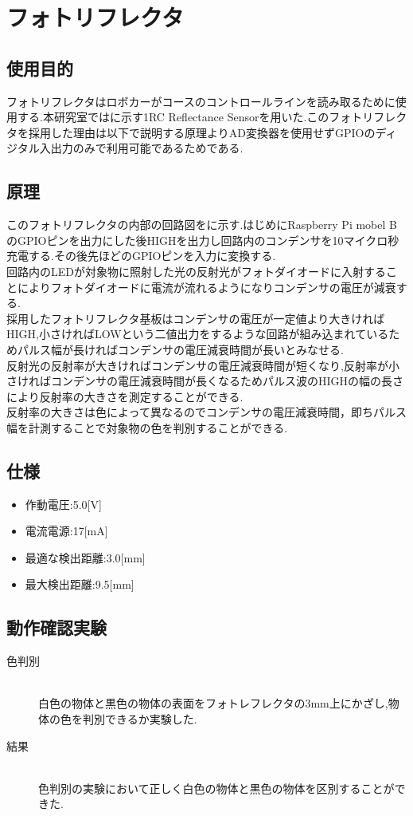 \section{フォトリフレクタ}
\subsection{使用目的}
フォトリフレクタはロボカーがコースのコントロールラインを読み取るために使用する.本研究室ではに示す1RC Reflectance Sensorを用いた.このフォトリフレクタを採用した理由は以下で説明する原理よりAD変換器を使用せずGPIOのディジタル入出力のみで利用可能であるためである.   


\subsection{原理}
このフォトリフレクタの内部の回路図\cite{pololu}をに示す.はじめにRaspberry Pi mobel BのGPIOピンを出力にした後HIGHを出力し回路内のコンデンサを10マイクロ秒充電する.その後先ほどのGPIOピンを入力に変換する.\\
回路内のLEDが対象物に照射した光の反射光がフォトダイオードに入射することによりフォトダイオードに電流が流れるようになりコンデンサの電圧が減衰する.\\
採用したフォトリフレクタ基板はコンデンサの電圧が一定値より大きければHIGH,小さければLOWという二値出力をするような回路が組み込まれているためパルス幅が長ければコンデンサの電圧減衰時間が長いとみなせる.\\
反射光の反射率が大きければコンデンサの電圧減衰時間が短くなり,反射率が小さければコンデンサの電圧減衰時間が長くなるためパルス波のHIGHの幅の長さにより反射率の大きさを測定することができる.\\
反射率の大きさは色によって異なるのでコンデンサの電圧減衰時間，即ちパルス幅を計測することで対象物の色を判別することができる.

\subsection*{仕様}
\begin{itemize}
\item 作動電圧:5.0[V]
\item 電流電源:17[mA]
\item 最適な検出距離:3.0[mm]
\item 最大検出距離:9.5[mm]
\end{itemize}


\subsection{動作確認実験}
\begin{description}
      \item[色判別] \mbox{} \\
      白色の物体と黒色の物体の表面をフォトレフレクタの3mm上にかざし,物体の色を判別できるか実験した.      
      \item[結果] \mbox{} \\
      色判別の実験において正しく白色の物体と黒色の物体を区別することができた.    
\end{description}

